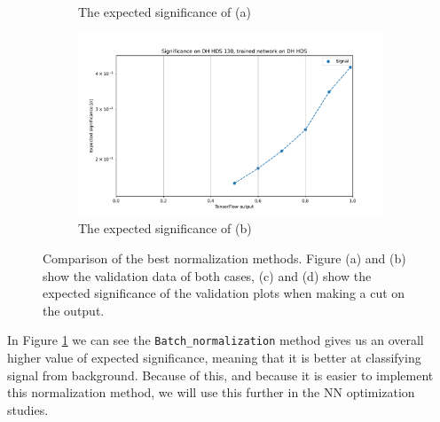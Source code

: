 \documentclass[12pt, a4paper]{book}
\begin{document}
\begin{figure}[!ht]
\begin{subfigure}[b]{0.49\textwidth}
      \caption{The expected significance of (a)}
   \end{subfigure}
   \hfill
   \begin{subfigure}[b]{0.49\textwidth}
      \centering
      \includegraphics[width=1\textwidth]{BatchNorm/EXP_SIG.pdf}
      \caption{The expected significance of (b)}
   \end{subfigure}
   \caption[Comparison of best NN normalization methods and expected significance calculation]{Comparison of the best normalization methods. Figure (a) and (b) show the validation data of both cases, (c) and (d) show the expected significance of the validation plots when making a cut on the output. }\label{fig:BestNormie}
\end{figure}
\noindent In Figure \ref{fig:BestNormie} we can see the \verb|Batch_normalization| method gives us an overall higher value of expected significance, meaning that it is better at classifying signal from background. 
Because of this, and because it is easier to implement this normalization method, we will use this further in the NN optimization studies. 
\clearpage
\end{document}
